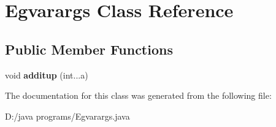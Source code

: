 \hypertarget{class_egvarargs}{}\section{Egvarargs Class Reference}
\label{class_egvarargs}
\subsection*{Public Member Functions}
\begin{DoxyCompactItemize}
\item 
\mbox{\label{class_egvarargs_a385f12d130bbffdd0677d63c5c34dafc}} 
void {\bfseries additup} (int...\+a)
\end{DoxyCompactItemize}


The documentation for this class was generated from the following file\+:\begin{DoxyCompactItemize}
\item 
D\+:/java programs/Egvarargs.\+java\end{DoxyCompactItemize}
